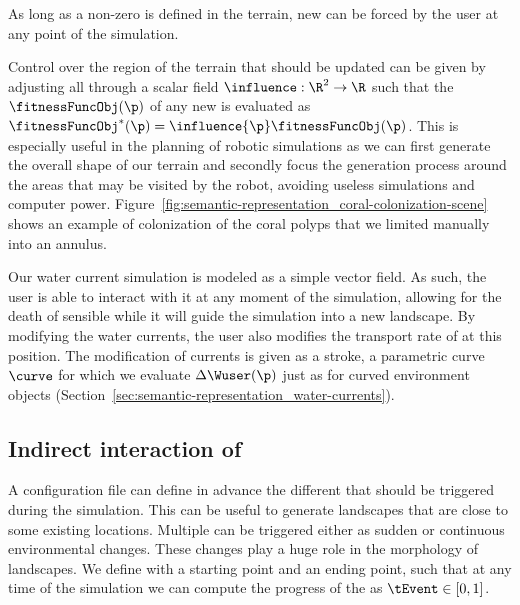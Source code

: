As long as a non-zero  is defined in the terrain, new  can be forced by the user at any point of the simulation. 

Control over the region of the terrain that should be updated can be given by adjusting all  through a scalar field $\influence: \R^2 \to \R $ such that the  $\fitnessFuncObj(\p)$ of any new  is evaluated as $\fitnessFuncObj^*(\p) = \influence{\p} \fitnessFuncObj(\p)$. This is especially useful in the planning of robotic simulations as we can first generate the overall shape of our terrain and secondly focus the generation process around the areas that may be visited by the robot, avoiding useless simulations and computer power. 
Figure~\ref{fig:semantic-representation_coral-colonization-scene} shows an example of colonization of the coral polyps that we limited manually into an annulus.



Our water current simulation is modeled as a simple vector field. As such, the user is able to interact with it at any moment of the simulation, allowing for the death of sensible  while it will guide the simulation into a new landscape. By modifying the water currents, the user also modifies the transport rate of  at this position. The modification of currents is given as a stroke, a parametric curve $\curve$ for which we evaluate $\Delta \Wuser(\p)$ just as for curved environment objects (Section~\ref{sec:semantic-representation_water-currents}).

\subsection{Indirect interaction of }
\label{sec:semantic-representation_events}
A configuration file can define in advance the different  that should be triggered during the simulation. This can be useful to generate landscapes that are close to some existing locations. 
Multiple  can be triggered either as sudden or continuous environmental changes. These changes play a huge role in the morphology of landscapes.
We define  with a starting point and an ending point, such that at any time of the simulation we can compute the progress of the  as $\tEvent \in [0, 1]$.

